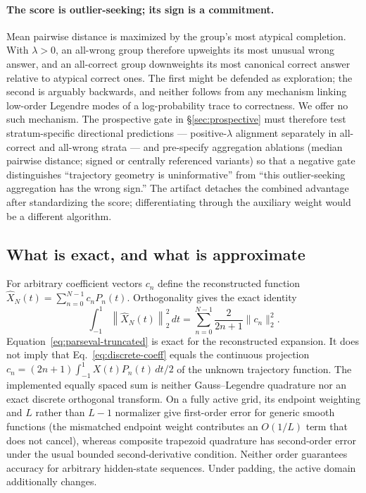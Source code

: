 \documentclass{article}
\begin{document}
\paragraph{The score is outlier-seeking; its sign is a commitment.}
Mean pairwise distance is maximized by the group's most atypical
completion. With $\lambda>0$, an all-wrong group therefore upweights its
most unusual wrong answer, and an all-correct group downweights its most
canonical correct answer relative to atypical correct ones. The first
might be defended as exploration; the second is arguably backwards, and
neither follows from any mechanism linking low-order Legendre modes of a
log-probability trace to correctness. We offer no such mechanism. The
prospective gate in \S\ref{sec:prospective} must therefore test stratum-specific directional
predictions --- positive-$\lambda$ alignment separately in all-correct
and all-wrong strata --- and pre-specify aggregation ablations (median
pairwise distance; signed or centrally referenced variants) so that a
negative gate distinguishes ``trajectory geometry is uninformative'' from
``this outlier-seeking aggregation has the wrong sign.'' The artifact
detaches the combined advantage after standardizing the score; differentiating
through the auxiliary weight would be a different algorithm.

\subsection{What is exact, and what is approximate}

For arbitrary coefficient vectors $c_n$ define the reconstructed function
$\widehat X_N(t)=\sum_{n=0}^{N-1}c_nP_n(t)$.  Orthogonality gives the exact
identity
\begin{equation}
  \int_{-1}^{1}\left\|\widehat X_N(t)\right\|_2^2\,dt
  =\sum_{n=0}^{N-1}\frac{2}{2n+1}\|c_n\|_2^2.
  \label{eq:parseval-truncated}
\end{equation}
Equation~\eqref{eq:parseval-truncated} is exact for the reconstructed expansion.
It does not imply that Eq.~\eqref{eq:discrete-coeff} equals the continuous
projection $c_n=(2n+1)\int_{-1}^1X(t)P_n(t)\,dt/2$ of the unknown
trajectory function. The implemented equally spaced sum is neither
Gauss--Legendre quadrature nor an exact discrete orthogonal transform.
On a fully active grid, its endpoint weighting and $L$ rather than $L-1$
normalizer give first-order error for generic smooth functions (the
mismatched endpoint weight contributes an $O(1/L)$ term that does not
cancel), whereas composite trapezoid quadrature has second-order error
under the usual bounded second-derivative condition. Neither order guarantees accuracy for arbitrary
hidden-state sequences. Under padding, the active domain additionally changes.
\end{document}
